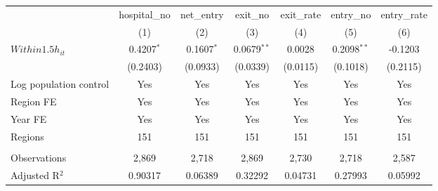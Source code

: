 \begingroup
\centering
\begin{tabular}{lcccccc}
   \toprule
                          & hospital\_no  & net\_entry   & exit\_no      & exit\_rate  & entry\_no     & entry\_rate \\    
                          & (1)           & (2)          & (3)           & (4)         & (5)           & (6)\\  
   \midrule 
   $Within1.5h_{it}$      & 0.4207$^{*}$  & 0.1607$^{*}$ & 0.0679$^{**}$ & 0.0028      & 0.2098$^{**}$ & -0.1203\\   
                          & (0.2403)      & (0.0933)     & (0.0339)      & (0.0115)    & (0.1018)      & (0.2115)\\   
   Log population control & Yes           & Yes          & Yes           & Yes         & Yes           & Yes\\  
   Region FE              & Yes           & Yes          & Yes           & Yes         & Yes           & Yes\\  
   Year FE                & Yes           & Yes          & Yes           & Yes         & Yes           & Yes\\  
   Regions                & 151           & 151          & 151           & 151         & 151           & 151\\  
    \\
   Observations           & 2,869         & 2,718        & 2,869         & 2,730       & 2,718         & 2,587\\  
   Adjusted R$^2$         & 0.90317       & 0.06389      & 0.32292       & 0.04731     & 0.27993       & 0.05992\\  
   \bottomrule
\end{tabular}
\par\endgroup
